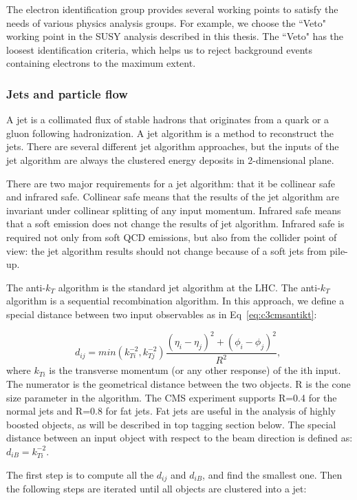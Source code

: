 The electron identification group provides several working points to satisfy the needs of various physics analysis groups. For example, we choose the ``Veto" working point in the SUSY analysis described in this thesis. The ``Veto" has the loosest identification criteria, which helps us to reject background events containing electrons to the maximum extent. 
\subsubsection{Jets and particle flow}

A jet is a collimated flux of stable hadrons that originates from a quark or a gluon following hadronization. A jet algorithm is a method to reconstruct the jets. There are several different jet algorithm approaches, but the inputs of the jet algorithm are always the clustered energy deposits in 2-dimensional plane. 

There are two major requirements for a jet algorithm: that it be collinear safe and infrared safe. Collinear safe means that the results of the jet algorithm are invariant under collinear splitting of any input momentum. Infrared safe means that a soft emission does not change the results of jet algorithm. Infrared safe is required not only from soft QCD emissions, but also from the collider point of view: the jet algorithm results should not change because of a soft jets from pile-up. 

The anti-$k_{T}$ algorithm\cite{Cacciari:2008gp} is the standard jet algorithm at the LHC. The anti-$k_{T}$ algorithm is a sequential recombination algorithm. In this approach, we define a special distance between two input observables as in  Eq~\ref{eq:c3cmsantikt}:

\begin{equation}
 d_{ij} = min(k_{Ti}^{-2},k_{Tj}^{-2})\frac{(\eta_{i}-\eta_{j})^{2}+(\phi_{i}-\phi_{j})^{2}}{R^{2}}, \;
 \label{eq:c3cmsantikt}
\end{equation}
where $k_{Ti}$ is the transverse momentum (or any other response) of the ith input. The numerator is the geometrical distance between the two objects. R is the cone size parameter in the algorithm. The CMS experiment supports R=0.4 for the normal jets and R=0.8 for fat jets. Fat jets are useful in the analysis of highly boosted objects, as will be described in top tagging section below. The special distance between an input object with respect to the beam direction is defined as: $d_{iB} = k_{Ti}^{-2}$.

The first step is to compute all the $d_{ij}$ and $d_{iB}$, and find the smallest one. Then the following steps are iterated until all objects are clustered into a jet: 

